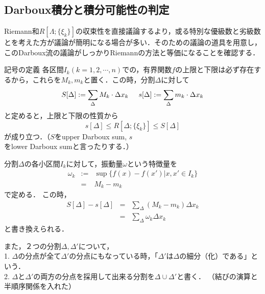 \documentclass[uplatex, dvipdfmx]{jsreport}
\begin{document}
\subsection{Darboux積分と積分可能性の判定}\label{subsection-Darboux}

Riemann和$R[\Lambda;\{\xi_k\}]$の収束性を直接議論するより，或る特別な優級数と劣級数とを考えた方が議論が簡明になる場合が多い．そのための議論の道具を用意し，このDarboux流の議論がしっかりRiemannの方法と等価になることを確認する．

\begin{itembox}[l]{記号の定義}
    各区間$I_k(k=1,2,\cdots,n)$での，有界関数$f$の上限と下限は必ず存在するから，これらを$M_k,m_k$と置く．この時，分割$\Delta$に対して
    \[ S[\Delta ] := \sum_\Delta M_k \cdot \Delta x_k \hspace{5mm} s[\Delta ] := \sum_\Delta m_k \cdot \Delta x_k \]
    と定めると，上限と下限の性質から
    \[ s[\Delta] \le R[\Delta;\{\xi_k\}] \le S[\Delta] \]
    が成り立つ．（$S$をupper Darboux sum, $s$をlower Darboux sumと言ったりする．）

    分割$\Delta$の各小区間$I_k$に対して，振動量$\omega$という特徴量を
    \begin{eqnarray*}\omega_k &:=& \sup \{ f(x)-f(x') | x,x' \in I_k \}\\ &=& M_k - m_k\end{eqnarray*}
    で定める．
    この時，\begin{eqnarray*}
        S[\Delta]-s[\Delta] &=& \sum_\Delta (M_k-m_k)\Delta x_k \\
        &=& \sum_\Delta \omega_k \Delta x_k
    \end{eqnarray*}と書き換えられる．

    また，２つの分割$\Delta, \Delta'$について，\\
    1. $\Delta$の分点が全て$\Delta'$の分点にもなっている時，「$\Delta'$は$\Delta$の細分（化）である」という．\\
    2. $\Delta$と$\Delta'$の両方の分点を採用して出来る分割を$\Delta\cup\Delta'$と書く．
    （結びの演算と半順序関係を入れた）
\end{itembox}
\end{document}
